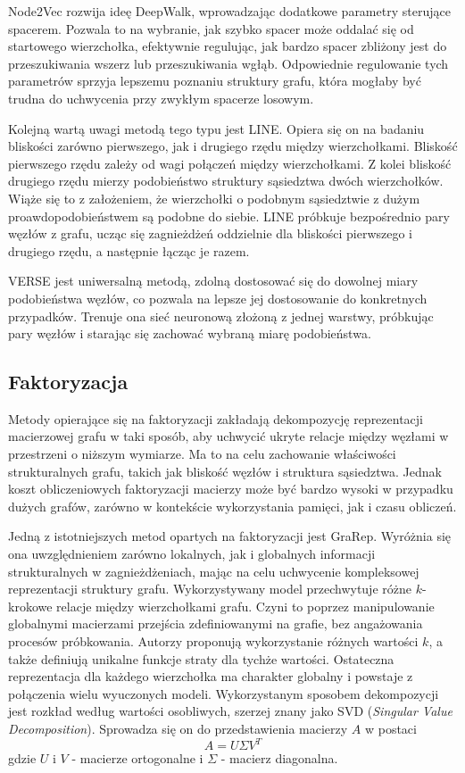         Node2Vec\cite{Grover_Leskovec_2016} rozwija ideę DeepWalk, wprowadzając dodatkowe parametry sterujące spacerem. Pozwala to na wybranie, jak szybko spacer może oddalać się od startowego wierzchołka, efektywnie regulując, jak bardzo spacer zbliżony jest do przeszukiwania wszerz lub przeszukiwania wgłąb. Odpowiednie regulowanie tych parametrów sprzyja lepszemu poznaniu struktury grafu, która mogłaby być trudna do uchwycenia przy zwykłym spacerze losowym. 
        
        Kolejną wartą uwagi metodą tego typu jest LINE\cite{Tang_Qu_Wang_Zhang_Yan_Mei_2015}. Opiera się on na badaniu bliskości zarówno pierwszego, jak i drugiego rzędu między wierzchołkami. Bliskość pierwszego rzędu zależy od wagi połączeń między wierzchołkami. Z kolei bliskość drugiego rzędu mierzy podobieństwo struktury sąsiedztwa dwóch wierzchołków. Wiąże się to z założeniem, że wierzchołki o podobnym sąsiedztwie z dużym proawdopodobieństwem są podobne do siebie. LINE próbkuje bezpośrednio pary węzłów z grafu, ucząc się zagnieżdżeń oddzielnie dla bliskości pierwszego i drugiego rzędu, a następnie łącząc je razem. 
        
        VERSE\cite{Tsitsulin_Mottin_Karras_Müller_2018} jest uniwersalną metodą, zdolną dostosować się do dowolnej miary podobieństwa węzłów, co pozwala na lepsze jej dostosowanie do konkretnych przypadków. Trenuje ona sieć neuronową złożoną z jednej warstwy, próbkując pary węzłów i starając się zachować wybraną miarę podobieństwa.

    \subsection{Faktoryzacja}
        Metody opierające się na faktoryzacji zakładają dekompozycję reprezentacji macierzowej grafu w taki sposób, aby uchwycić ukryte relacje między węzłami w przestrzeni o niższym wymiarze. Ma to na celu zachowanie właściwości strukturalnych grafu, takich jak bliskość węzłów i struktura sąsiedztwa. Jednak koszt obliczeniowych faktoryzacji macierzy może być bardzo wysoki w przypadku dużych grafów, zarówno w kontekście wykorzystania pamięci, jak i czasu obliczeń.

        Jedną z istotniejszych metod opartych na faktoryzacji jest GraRep\cite{Cao_Lu_Xu_2015}. Wyróżnia się ona uwzględnieniem zarówno lokalnych, jak i globalnych informacji strukturalnych w zagnieżdżeniach, mając na celu uchwycenie kompleksowej reprezentacji struktury grafu. Wykorzystywany model przechwytuje różne $k$-krokowe relacje między wierzchołkami grafu. Czyni to poprzez manipulowanie globalnymi macierzami przejścia zdefiniowanymi na grafie, bez angażowania procesów próbkowania. Autorzy proponują wykorzystanie różnych wartości $k$, a także definiują unikalne funkcje straty dla tychże wartości. Ostateczna reprezentacja dla każdego wierzchołka ma charakter globalny i powstaje z połączenia wielu wyuczonych modeli. Wykorzystanym sposobem dekompozycji jest rozkład według wartości osobliwych, szerzej znany jako SVD (\emph{Singular Value Decomposition}). Sprowadza się on do przedstawienia macierzy $A$ w postaci 
        \[
            A = U \Sigma V^T  
        \]
        gdzie $U$ i $V$ - macierze ortogonalne i $\Sigma$ - macierz diagonalna.
         

